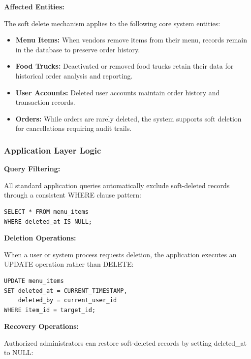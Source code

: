 \documentclass[12pt,a4paper]{article}
\begin{document}
\vspace{0.5em}

\textbf{Affected Entities:}

The soft delete mechanism applies to the following core system entities:

\begin{itemize}[leftmargin=2em, itemsep=6pt]
    \item \textbf{Menu Items:} When vendors remove items from their menu, records remain in the database to preserve order history.
    \item \textbf{Food Trucks:} Deactivated or removed food trucks retain their data for historical order analysis and reporting.
    \item \textbf{User Accounts:} Deleted user accounts maintain order history and transaction records.
    \item \textbf{Orders:} While orders are rarely deleted, the system supports soft deletion for cancellations requiring audit trails.
\end{itemize}

\subsubsection{Application Layer Logic}

\textbf{Query Filtering:}

All standard application queries automatically exclude soft-deleted records through a consistent WHERE clause pattern:

\begin{verbatim}
SELECT * FROM menu_items 
WHERE deleted_at IS NULL;
\end{verbatim}

\vspace{0.5em}

\textbf{Deletion Operations:}

When a user or system process requests deletion, the application executes an UPDATE operation rather than DELETE:

\begin{verbatim}
UPDATE menu_items 
SET deleted_at = CURRENT_TIMESTAMP,
    deleted_by = current_user_id
WHERE item_id = target_id;
\end{verbatim}

\vspace{0.5em}

\textbf{Recovery Operations:}

Authorized administrators can restore soft-deleted records by setting deleted\_at to NULL:
\end{document}
